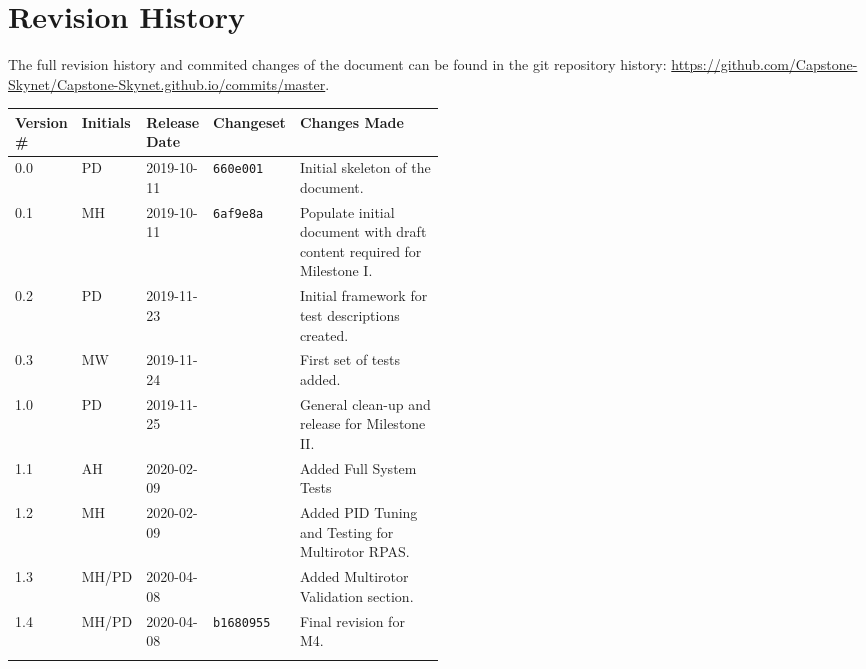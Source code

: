 \section*{Revision History}
The full revision history and commited changes of the document can be found in the git repository history: \href{https://github.com/Capstone-Skynet/Capstone-Skynet.github.io}{https://github.com/Capstone-Skynet/Capstone-Skynet.github.io/commits/master}.

\begin{table}[H]
\begin{tabular}{*{4}{l}p{0.5\linewidth}}
\hline
Version \# & Initials & Release Date & Changeset & Changes Made \\ \hline

0.0 & PD & 2019-10-11 & \texttt{660e001} & Initial skeleton of the document.\\
0.1 & MH & 2019-10-11 & \texttt{6af9e8a} & Populate initial document with draft content required for Milestone I.\\
0.2 & PD & 2019-11-23 & & Initial framework for test descriptions created.\\
0.3 & MW & 2019-11-24 & & First set of tests added.\\
1.0 & PD & 2019-11-25 & & General clean-up and release for Milestone II.\\
1.1 & AH & 2020-02-09 & & Added Full System Tests \\
1.2 & MH & 2020-02-09 & & Added PID Tuning and Testing for Multirotor RPAS. \\
1.3 & MH/PD & 2020-04-08 & & Added Multirotor Validation section. \\
1.4 & MH/PD & 2020-04-08 & \texttt{b1680955} & Final revision for M4.\\
 & & & \\ \hline
\end{tabular}
\end{table}
